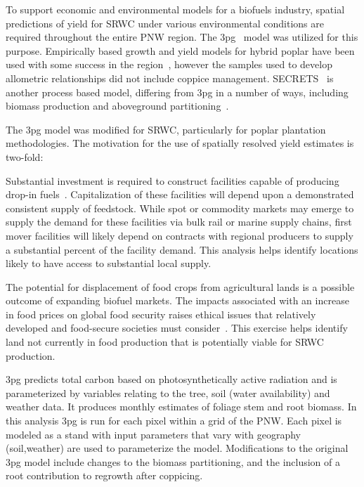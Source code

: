 \documentclass[preprint,review,12pt]{elsarticle}
\begin{document}
To support economic and environmental models for a biofuels industry,
spatial predictions of yield for \acf{SRWC} under various
environmental conditions are required throughout the entire \acf{PNW}
region.  The
\acf{3pg}~\cite{landsberg2010physiological,Landsberg1997,Sands2004}
model was utilized for this purpose.  Empirically based growth and
yield models for hybrid poplar have been used with some success in the
region~\cite{Clendenen1996}, however the samples used to develop
allometric relationships did not include coppice management.
\ac{SECRETS}~\cite{Sampson2001} is another process based model,
differing from \ac{3pg} in a number of ways, including biomass
production and aboveground partitioning~\cite{SurendranNair2012}.

The \ac{3pg} model was modified for \ac{SRWC}, particularly
for poplar plantation methodologies. The motivation for the use of
spatially resolved yield estimates is two-fold:
\begin{description}
\item[Biofuels production system optimization] Substantial investment
  is required to construct facilities capable of producing drop-in
  fuels~\cite{Parker2010a}. Capitalization of these facilities will
  depend upon a demonstrated
  consistent supply of feedstock. While spot or commodity markets may
  emerge to supply the demand for these facilities via bulk rail or
  marine supply chains, first mover facilities will
  likely depend on contracts with regional producers to supply a
  substantial percent of the facility demand. This analysis helps
  identify locations likely to have access to substantial local
  supply.
\item[Land use] The potential for displacement of food crops from
  agricultural lands is a possible outcome of expanding biofuel
  markets.
  The impacts associated with an increase in food prices on global
  food security raises ethical issues that relatively developed and
  food-secure societies must consider~\cite{Pimentel2008}. This
  exercise helps identify land not currently in food production that
  is potentially viable for \ac{SRWC} production.
\item
\end{description}

\ac{3pg} predicts total carbon based on photosynthetically active
radiation and is parameterized by variables relating to the tree, soil
(water availability) and weather data. It produces monthly estimates
of foliage stem and root biomass. In this analysis \ac{3pg} is run for
each pixel within a grid of the \ac{PNW}. Each pixel is modeled as a
stand with input parameters that vary with geography (soil,weather)
are used to parameterize the model. Modifications to the original
\ac{3pg} model include changes to the biomass partitioning, and the
inclusion of a root contribution to regrowth after coppicing.
\end{document}
